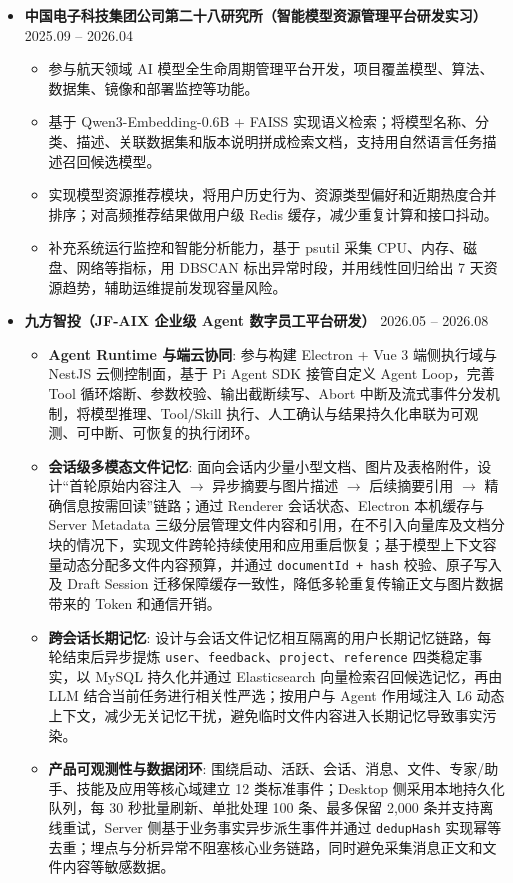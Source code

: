\documentclass[zh]{resume}
\begin{document}
\begin{itemize}
  \item \textbf{中国电子科技集团公司第二十八研究所（智能模型资源管理平台研发实习）} \hfill 2025.09 -- 2026.04
  \begin{itemize}
    \item 参与航天领域 AI 模型全生命周期管理平台开发，项目覆盖模型、算法、数据集、镜像和部署监控等功能。
    \item 基于 Qwen3-Embedding-0.6B + FAISS 实现语义检索；将模型名称、分类、描述、关联数据集和版本说明拼成检索文档，支持用自然语言任务描述召回候选模型。
    \item 实现模型资源推荐模块，将用户历史行为、资源类型偏好和近期热度合并排序；对高频推荐结果做用户级 Redis 缓存，减少重复计算和接口抖动。
    \item 补充系统运行监控和智能分析能力，基于 psutil 采集 CPU、内存、磁盘、网络等指标，用 DBSCAN 标出异常时段，并用线性回归给出 7 天资源趋势，辅助运维提前发现容量风险。
  \end{itemize}

  \item \textbf{九方智投（JF-AIX 企业级 Agent 数字员工平台研发）} \hfill 2026.05 -- 2026.08
  \begin{itemize}
    \item \textbf{Agent Runtime 与端云协同}: 参与构建 Electron + Vue 3 端侧执行域与 NestJS 云侧控制面，基于 Pi Agent SDK 接管自定义 Agent Loop，完善 Tool 循环熔断、参数校验、输出截断续写、Abort 中断及流式事件分发机制，将模型推理、Tool/Skill 执行、人工确认与结果持久化串联为可观测、可中断、可恢复的执行闭环。
    \item \textbf{会话级多模态文件记忆}: 面向会话内少量小型文档、图片及表格附件，设计``首轮原始内容注入 $\rightarrow$ 异步摘要与图片描述 $\rightarrow$ 后续摘要引用 $\rightarrow$ 精确信息按需回读''链路；通过 Renderer 会话状态、Electron 本机缓存与 Server Metadata 三级分层管理文件内容和引用，在不引入向量库及文档分块的情况下，实现文件跨轮持续使用和应用重启恢复；基于模型上下文容量动态分配多文件内容预算，并通过 \texttt{documentId + hash} 校验、原子写入及 Draft Session 迁移保障缓存一致性，降低多轮重复传输正文与图片数据带来的 Token 和通信开销。
    \item \textbf{跨会话长期记忆}: 设计与会话文件记忆相互隔离的用户长期记忆链路，每轮结束后异步提炼 \texttt{user}、\texttt{feedback}、\texttt{project}、\texttt{reference} 四类稳定事实，以 MySQL 持久化并通过 Elasticsearch 向量检索召回候选记忆，再由 LLM 结合当前任务进行相关性严选；按用户与 Agent 作用域注入 L6 动态上下文，减少无关记忆干扰，避免临时文件内容进入长期记忆导致事实污染。
    \item \textbf{产品可观测性与数据闭环}: 围绕启动、活跃、会话、消息、文件、专家/助手、技能及应用等核心域建立 12 类标准事件；Desktop 侧采用本地持久化队列，每 30 秒批量刷新、单批处理 100 条、最多保留 2,000 条并支持离线重试，Server 侧基于业务事实异步派生事件并通过 \texttt{dedupHash} 实现幂等去重；埋点与分析异常不阻塞核心业务链路，同时避免采集消息正文和文件内容等敏感数据。
  \end{itemize}
\end{itemize}
\end{document}
